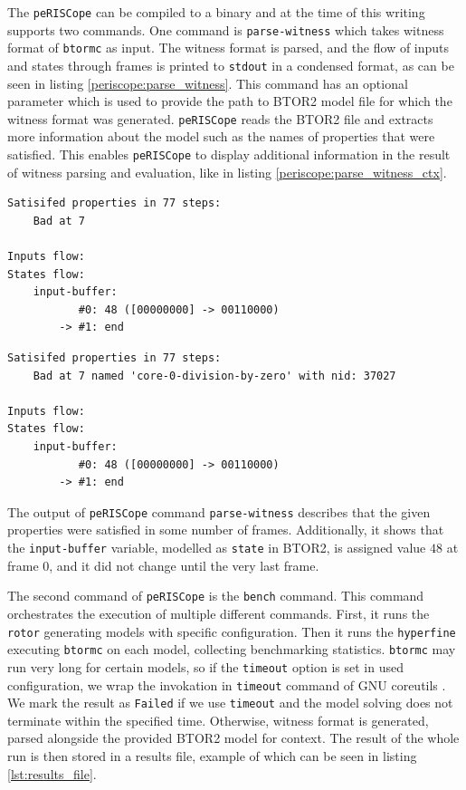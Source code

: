\documentclass[12pt]{article}
\begin{document}
The \texttt{peRISCope} can be compiled to a binary and at the time of this
writing supports two commands. One command is \texttt{parse-witness} which
takes witness format of \texttt{btormc} as input. The witness format is parsed,
and the flow of inputs and states through frames is printed to \texttt{stdout}
in a condensed format, as can be seen in listing \ref{periscope:parse_witness}.
This command has an optional parameter which is used to provide the path to
BTOR2 model file for which the witness format was generated. \texttt{peRISCope}
reads the BTOR2 file and extracts more information about the model such as the
names of properties that were satisfied. This enables \texttt{peRISCope} to
display additional information in the result of witness parsing and evaluation,
like in listing \ref{periscope:parse_witness_ctx}.

\begin{lstlisting}[label=periscope:parse_witness, caption={Example output of
                \texttt{peRISCope} \texttt{parse-witness} command.},
                captionpos=b]
Satisifed properties in 77 steps:
    Bad at 7

Inputs flow:
States flow:
    input-buffer:
           #0: 48 ([00000000] -> 00110000)
        -> #1: end
\end{lstlisting}

\begin{lstlisting}[label=periscope:parse_witness_ctx, caption={Example output
                of \texttt{peRISCope} \texttt{ parse-witness} command with
                provided BTOR2 file for context.}, captionpos=b]
Satisifed properties in 77 steps:
    Bad at 7 named 'core-0-division-by-zero' with nid: 37027

Inputs flow:
States flow:
    input-buffer:
           #0: 48 ([00000000] -> 00110000)
        -> #1: end
\end{lstlisting}

The output of \texttt{peRISCope} command \texttt{parse-witness} describes that
the given properties were satisfied in some number of frames. Additionally, it
shows that the \texttt{input-buffer} variable, modelled as \texttt{state} in
BTOR2, is assigned value $48$ at frame $0$, and it did not change until the
very last frame.

The second command of \texttt{peRISCope} is the \texttt{bench} command. This
command orchestrates the execution of multiple different commands. First, it 
runs the \texttt{rotor} generating models with specific configuration. Then it
runs the \texttt{hyperfine} executing \texttt{btormc} on each model, collecting
benchmarking statistics. \texttt{btormc} may run very long for certain models,
so if the \texttt{timeout} option is set in used configuration, we wrap the 
invokation in \texttt{timeout} command of GNU coreutils \cite{gnu:coreutils}.
We mark the result as \texttt{Failed} if we use \texttt{timeout} and the model
solving does not terminate within the specified time. Otherwise, witness format
is generated, parsed alongside the provided BTOR2 model for context. The result
of the whole run is then stored in a results file, example of which can be seen
in listing \ref{lst:results_file}.
\end{document}
